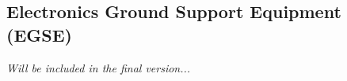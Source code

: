 
\subsection{Electronics Ground Support Equipment (EGSE)}
%
\textit{Will be included in the final version...}

